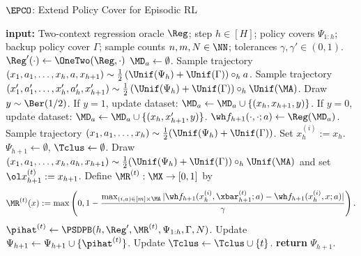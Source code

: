 \begin{algorithm}[t]
	\caption{$\EPCO$: Extend Policy Cover for Episodic RL}
	\label{alg:extend-pc-online}
	\begin{algorithmic}[1]\onehalfspacing
          \State \textbf{input:} Two-context regression oracle $\Reg$; step $h \in [H]$; policy covers $\Psi_{1:h}$; backup policy cover $\Gamma$; sample counts $n,m,N\in\NN$; tolerances $\gamma,\gamma' \in (0,1)$.
        \State $\Reg'(\cdot) \gets \OneTwo(\Reg,\cdot)$ 
            \State $\MD_a \gets \emptyset$.
                \State Sample trajectory $(x_1,a_1,\dots,x_h,a,x_{h+1}) \sim \frac{1}{2}\left(\Unif(\Psi_h) + \Unif(\Gamma)\right) \circ_h a$.
                \State Sample trajectory $(x'_1,a'_1,\dots,x'_h,a'_h,x'_{h+1}) \sim \frac{1}{2}\left(\Unif(\Psi_h) + \Unif(\Gamma)\right) \circ_h \Unif(\MA)$.
                \State Draw $y \sim \Ber(1/2)$.
                \State If $y = 1$, update dataset: $\MD_a \gets \MD_a \cup \{(x_h,x_{h+1},y)\}$.
                \State If $y = 0$, update dataset: $\MD_a \gets \MD_a \cup \{(x_h,x'_{h+1},y)\}$.
            \EndFor
            \State $\wh f_{h+1}(\cdot,\cdot;a) \gets \Reg(\MD_a)$. \label{line:hat-f-regression}
        \EndFor
            \State Sample trajectory $(x_1,a_1,\dots,x_h) \sim \frac{1}{2}(\Unif(\Psi_h)+\Unif(\Gamma))$.
            \State Set $x^{(i)}_h := x_h$.
        \EndFor
        \State $\Psi_{h+1} \gets \emptyset$, $\Tclus \gets \emptyset$.
            \State Draw $(x_1,a_1,\dots,x_h,a_h,x_{h+1}) \sim \frac{1}{2}(\Unif(\Psi_h)+\Unif(\Gamma)) \circ_h \Unif(\MA)$ and set $\ol x_{h+1}^{(t)} := x_{h+1}$.
            \State Define $\MR^{(t)}: \MX \to [0,1]$ by 
            \[\MR^{(t)}(x) := \max\left(0, 1-\frac{\max_{(i,a) \in [m]\times\MA} |\wh f_{h+1}(x_h^{(i)},\xbar_{h+1}^{(t)};a) - \wh f_{h+1}(x_h^{(i)}, x; a)|}{\gamma}\right).\] \label{line:rt-def-online}
            \label{line:cluster-threshold-online}
                \State $\pihat^{(t)} \gets \PSDPB(h, \Reg', \MR^{(t)}, \Psi_{1:h}, \Gamma, N)$.\label{line:psdp-call-online}
                \State Update $\Psi_{h+1} \gets \Psi_{h+1} \cup \{\pihat^{(t)}\}$.
                \State Update $\Tclus \gets \Tclus \cup \{t\}$.
            \EndIf
        \EndFor 
        \State \textbf{return} $\Psi_{h+1}$.
	\end{algorithmic}
\end{algorithm}
